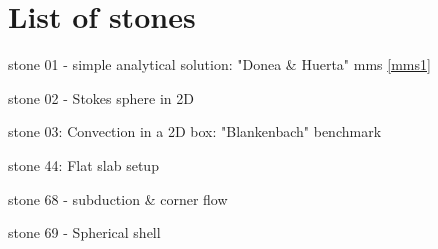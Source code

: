\section{List of stones} %


{\small 

\noindent stone 01 - simple analytical solution: "Donea \& Huerta" mms \ref{mms1} 


\noindent stone 02 - Stokes sphere in 2D 


\noindent stone 03: Convection in a 2D box: "Blankenbach" benchmark \cite{blbc89}


\noindent stone 44: Flat slab setup 


\noindent stone 68 - subduction \& corner flow


\noindent stone 69 - Spherical shell 


}




